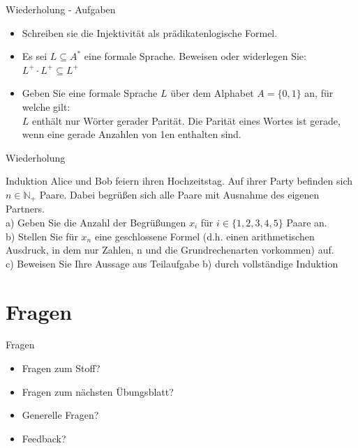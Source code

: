 	
	
	\begin{frame} {Wiederholung - Aufgaben}
		\begin{itemize}
			\item Schreiben sie die Injektivität als prädikatenlogische Formel.
			\pause
			\item Es sei $L \subseteq A^*$ eine formale Sprache. Beweisen oder widerlegen Sie:\\
			$L^+ \cdot L^+ \subseteq L^+$
			\pause
			\item Geben Sie eine formale Sprache $L$ über dem Alphabet $A=\{0,1\}$ an, für welche gilt:\\
				$L$ enthält nur Wörter gerader Parität. 
				Die Parität eines Wortes ist gerade, wenn eine gerade Anzahlen von 1en enthalten sind.
		\end{itemize}
	\end{frame}
	
	
	
	\begin{frame} {Wiederholung}
		\begin{block}{Induktion}
			Alice und Bob feiern ihren Hochzeitstag. Auf ihrer Party befinden sich $n \in \mathbb{N}_+$ Paare.
			Dabei begrüßen sich alle Paare mit Ausnahme des eigenen Partners.\\
			\vspace{10pt}
			a) Geben Sie die Anzahl der Begrüßungen $x_i$ für $i \in \{1,2,3,4,5\}$ Paare an.\\
			\vspace{10pt}
			b) Stellen Sie für $x_n$ eine geschlossene Formel (d.h. einen arithmetischen Ausdruck, in dem nur Zahlen, n und die Grundrechenarten vorkommen) auf.\\
			\vspace{10pt}
			c) Beweisen Sie Ihre Aussage aus Teilaufgabe b) durch vollständige Induktion
		\end{block}
	\end{frame}
	
	
	
	\section{Fragen}
	\begin{frame} {Fragen}
		\begin{itemize}
			\item Fragen zum Stoff?
			\item Fragen zum n\"achsten \"Ubungsblatt?
			\item Generelle Fragen?
			\item Feedback?
		\end{itemize}
	\end{frame}

